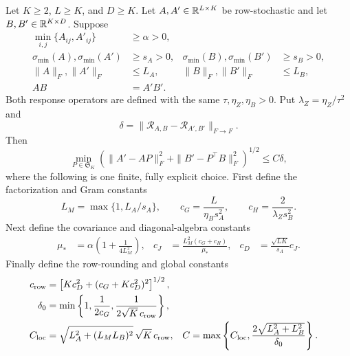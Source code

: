 \begin{theorem}
\label{thm:response_stability}
Let \(K\ge2\), \(L\ge K\), and \(D\ge K\).  Let
\(A,A'\in\mathbb{R}^{L\times K}\) be row-stochastic and let
\(B,B'\in\mathbb{R}^{K\times D}\).  Suppose
\begin{align}
 \min_{i,j}\{A_{ij},A'_{ij}\}&\ge\alpha>0,
 \label{eq:app_stability_interior}\\
 \sigma_{\min}(A),\sigma_{\min}(A')&\ge s_A>0,
 &
 \sigma_{\min}(B),\sigma_{\min}(B')&\ge s_B>0,
 \label{eq:app_stability_singular}\\
 \|A\|_F,\|A'\|_F&\le L_A,
 &
 \|B\|_F,\|B'\|_F&\le L_B,
 \label{eq:app_stability_norms}\\
 AB&=A'B'.
 \label{eq:app_stability_product}
\end{align}
Both response operators are defined with the same
\(\tau,\eta_Z,\eta_B>0\).  Put
\(\lambda_Z=\eta_Z/\tau^2\) and
\begin{equation}
 \delta=\|\mathcal R_{A,B}-\mathcal R_{A',B'}\|_{F\to F}.
 \label{eq:app_stability_delta}
\end{equation}
Then
\begin{equation}
 \min_{P\in\mathfrak S_K}
 \left(\|A'-AP\|_F^2+\|B'-P^\top B\|_F^2\right)^{1/2}
 \le C\delta,
 \label{eq:app_stability_conclusion}
\end{equation}
where the following is one finite, fully explicit choice.  First define the
factorization and Gram constants
\begin{equation}
 L_M=\max\{1,L_A/s_A\},\qquad
 c_G=\frac{L}{\eta_Bs_A^2},\qquad
 c_H=\frac{2}{\lambda_Zs_B^2}.
 \label{eq:app_stability_constants_gram}
\end{equation}
Next define the covariance and diagonal-algebra constants
\begin{align}
 \mu_*&=\alpha\left(1+\frac{1}{4L_M^2}\right),&
 c_J&=\frac{L_M^2(c_G+c_H)}{\mu_*},&
 c_D&=\frac{\sqrt{LK}}{s_A}c_J.
 \label{eq:app_stability_constants_cov}
\end{align}
Finally define the row-rounding and global constants
\begin{align}
 c_{\rm row}
 &=\left[Kc_D^2+(c_G+Kc_D^2)^2\right]^{1/2},
 \label{eq:app_stability_constants_row}\\
 \delta_0
 &=\min\left\{1,\frac{1}{2c_G},
                    \frac{1}{2\sqrt K\,c_{\rm row}}\right\},
 \label{eq:app_stability_constants_delta0}\\
 C_{\rm loc}
 &=\sqrt{L_A^2+(L_ML_B)^2}\,\sqrt K\,c_{\rm row},&
 C
 &=\max\left\{C_{\rm loc},
       \frac{2\sqrt{L_A^2+L_B^2}}{\delta_0}\right\}.
 \label{eq:app_stability_constants_global}
\end{align}
\end{theorem}

